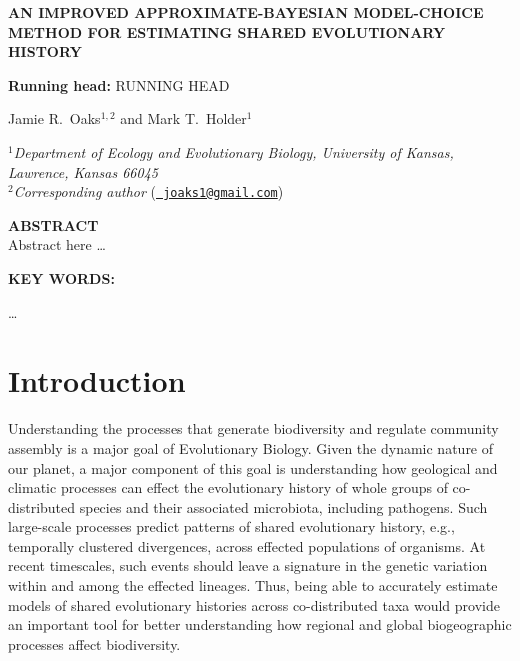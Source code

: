 \documentclass[letterpaper,12pt]{article}
\begin{document}
\doublespacing
\raggedright
\setlength{\parindent}{0.5in}
\begin{linenumbers}

\begin{titlepage}
    \begin{flushleft}
        \sffamily

        \MakeUppercase{\large\bfseries An Improved Approximate-Bayesian
            Model-choice Method for Estimating Shared Evolutionary History}

        \vspace{12pt}
        \textbf{Running head:} \MakeUppercase{Running head}

        \vspace{12pt}
        Jamie R.\ Oaks$^{1,2}$ and Mark T.\ Holder$^{1}$

        \bigskip
        $^1$\emph{Department of Ecology and Evolutionary Biology,
            University of Kansas,
            Lawrence, Kansas 66045}\\[.1in]
        $^2$\emph{Corresponding author} (\href{mailto:joaks1@gmail.com}{\tt
        joaks1@gmail.com})\\

    \end{flushleft}
\end{titlepage}

{\sffamily
    \noindent\textbf{ABSTRACT} \\
    \noindent Abstract here \ldots

    \vspace{12pt}
    \noindent\textbf{KEY WORDS: } 
}

\newpage
\noindent \ldots

\section*{Introduction}
Understanding the processes that generate biodiversity and regulate
community assembly is a major goal of Evolutionary Biology.
Given the dynamic nature of our planet, a major component of this goal is
understanding how geological and climatic processes can effect the
evolutionary history of whole groups of co-distributed species and their
associated microbiota, including pathogens.
Such large-scale processes predict patterns of shared evolutionary history,
e.g., temporally clustered divergences, across effected populations of
organisms.
At recent timescales, such events should leave a signature in the genetic
variation within and among the effected lineages.
Thus, being able to accurately estimate models of shared evolutionary
histories across co-distributed taxa would provide an important
tool for better understanding how regional and global biogeographic
processes affect biodiversity.


\end{linenumbers}
\end{document}
